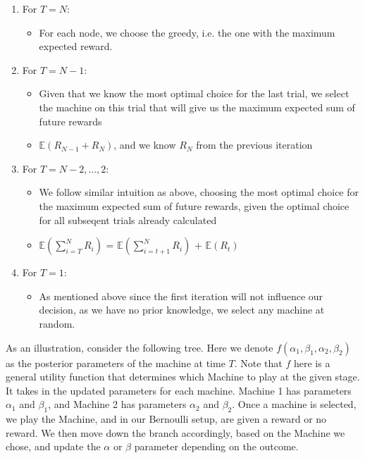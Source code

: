 \documentclass{article}
\begin{document}
\begin{enumerate}
\item For $T = N$:
	\begin{itemize}
	\item For each node, we choose the greedy, i.e. the one with the maximum expected reward.
	\end{itemize}
\item For $T = N-1$:
	\begin{itemize}
	\item Given that we know the most optimal choice for the last trial, we select the machine on this trial that will give us the maximum expected sum of future rewards
	\item $\mathbb{E}(R_{N-1} + R_{N})$, and we know $R_N$ from the previous iteration
	\end{itemize}
\item For $T = N-2,..., 2$:
	\begin{itemize}
	\item We follow similar intuition as above, choosing the most optimal choice for the maximum expected sum of future rewards, given the optimal choice for all subseqent trials already calculated
	\item $\mathbb{E}(\displaystyle\sum_{i=T}^{N} R_i)$ = $\mathbb{E}(\displaystyle\sum_{i=t+1}^{N} R_i)$ + $\mathbb{E}(R_t)$
	\end{itemize}
\item For $T = 1$:
	\begin{itemize}
	\item As mentioned above since the first iteration will not influence our decision, as we have no prior knowledge, we select any machine at random.
	\end{itemize}
\end{enumerate}

As an illustration, consider the following tree. Here we denote $f(\alpha_1, \beta_1, \alpha_2, \beta_2)$ as the posterior parameters of the machine at time $T$. Note that $f$ here is a general utility function that determines which Machine to play at the given stage. It takes in the updated parameters for each machine. Machine 1 has parameters $\alpha_1$ and $\beta_1$, and Machine 2 has parameters $\alpha_2$ and $\beta_2$. Once a machine is selected, we play the Machine, and in our Bernoulli setup, are given a reward or no reward. We then move down the branch accordingly, based on the Machine we chose, and update the $\alpha$ or $\beta$ parameter depending on the outcome.
\end{document}
